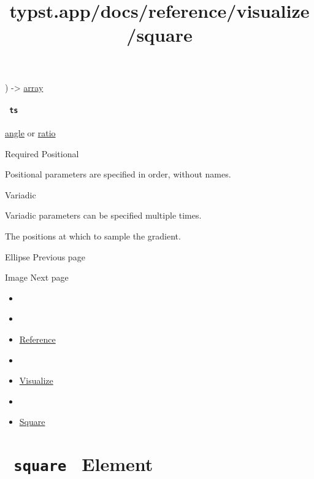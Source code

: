 ) -\textgreater{} \href{/docs/reference/foundations/array/}{array}

\paragraph{\texorpdfstring{\texttt{\ ts\ }}{ ts }}\label{definitions-samples-ts}

\href{/docs/reference/layout/angle/}{angle} {or}
\href{/docs/reference/layout/ratio/}{ratio}

{Required} {{ Positional }}

\label{definitions-samples-ts-positional-tooltip}
Positional parameters are specified in order, without names.

{{ Variadic }}

\label{definitions-samples-ts-variadic-tooltip}
Variadic parameters can be specified multiple times.

The positions at which to sample the gradient.

\href{/docs/reference/visualize/ellipse/}{\pandocbounded{}}

{ Ellipse } { Previous page }

\href{/docs/reference/visualize/image/}{\pandocbounded{}}

{ Image } { Next page }


\title{typst.app/docs/reference/visualize/square}

\begin{itemize}
\tightlist
\item
  \href{/docs}{}
\item
  
\item
  \href{/docs/reference/}{Reference}
\item
  
\item
  \href{/docs/reference/visualize/}{Visualize}
\item
  
\item
  \href{/docs/reference/visualize/square/}{Square}
\end{itemize}

\section{\texorpdfstring{\texttt{\ square\ } {{ Element
}}}{ square   Element }}\label{summary}

